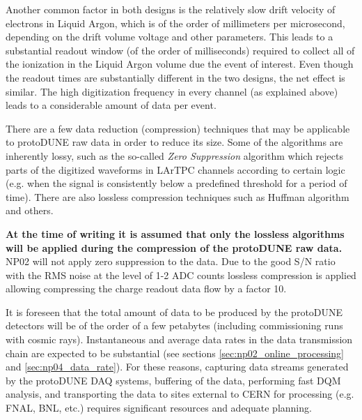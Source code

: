 \documentclass[12pt]{article}
\newcommand{\pd}{protoDUNE\xspace}
\begin{document}
\noindent
Another common factor in both designs is the relatively slow drift velocity of electrons in Liquid Argon, which is of the order of millimeters per microsecond,
depending on the drift volume voltage and other parameters. This leads to a substantial readout window (of the order of milliseconds) required to collect
all of the ionization in the Liquid Argon volume due the event of interest. Even though the readout times are substantially different in the two designs,
the net effect is similar. The high digitization frequency in every channel (as explained above) leads to a considerable amount of data per event.

There are a few data reduction (compression) techniques that may be applicable to \pd raw data in order to reduce its size. Some of the algorithms
are inherently lossy, such as the so-called \textit{Zero Suppression} algorithm which rejects parts of the digitized waveforms in LArTPC channels according
to certain logic (e.g. when the signal is consistently below a predefined threshold for a period of time). There are also lossless compression
techniques such as Huffman algorithm and others.

\textbf{At the time of writing it is assumed that only the lossless algorithms will be applied during the compression
of the \pd raw data.}
NP02 will not apply  zero suppression to the data. Due to the good S/N ratio with the RMS noise at the level of 1-2 ADC counts lossless compression is applied 
allowing compressing the charge readout data flow by a factor 10.

It is foreseen that the total amount of data to be produced by the \pd detectors will be of the order of a few
petabytes (including commissioning runs with cosmic rays). Instantaneous and average data rates in the data transmission chain are expected to be
substantial (see sections \ref{sec:np02_online_processing} and \ref{sec:np04_data_rate}).
For these reasons, capturing data streams generated by the protoDUNE DAQ systems, buffering of the data, performing fast DQM analysis,
and transporting the data to sites external to CERN for processing (e.g. FNAL, BNL, etc.) requires significant resources and adequate planning.
\end{document}
